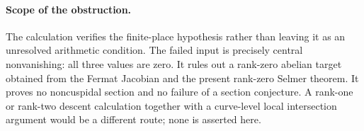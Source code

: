 \paragraph{Scope of the obstruction.}
The calculation verifies the finite-place hypothesis rather than
leaving it as an unresolved arithmetic condition.  The failed input
is precisely central nonvanishing: all three values are zero.
It rules out a rank-zero abelian target obtained from the Fermat
Jacobian and the present rank-zero Selmer theorem.  It proves no
noncuspidal section and no failure of a section conjecture.  A
rank-one or rank-two descent calculation together with a curve-level
local intersection argument would be a different route; none is
asserted here.
